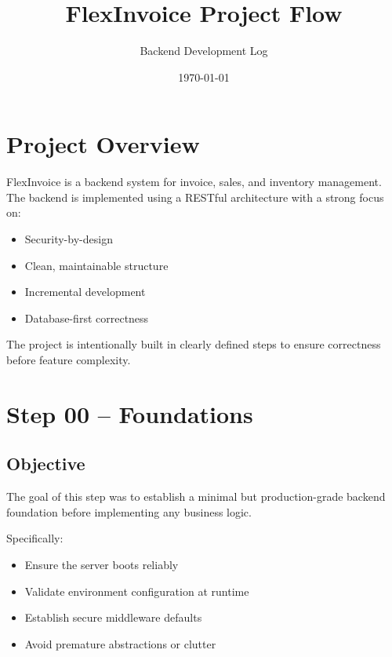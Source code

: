 \documentclass[11pt,a4paper]{article}
\title{\textbf{FlexInvoice Project Flow}}
\author{Backend Development Log}
\date{\today}
\begin{document}
    \maketitle
    \tableofcontents
    \newpage

    \section{Project Overview}

    FlexInvoice is a backend system for invoice, sales, and inventory management.
    The backend is implemented using a RESTful architecture with a strong focus on:

    \begin{itemize}
        \item Security-by-design
        \item Clean, maintainable structure
        \item Incremental development
        \item Database-first correctness
    \end{itemize}

    The project is intentionally built in clearly defined steps to ensure correctness
    before feature complexity.

    \section{Step 00 -- Foundations}

    \subsection{Objective}

    The goal of this step was to establish a minimal but production-grade backend
    foundation before implementing any business logic.

    Specifically:
    \begin{itemize}
        \item Ensure the server boots reliably
        \item Validate environment configuration at runtime
        \item Establish secure middleware defaults
        \item Avoid premature abstractions or clutter
    \end{itemize}
\end{document}
